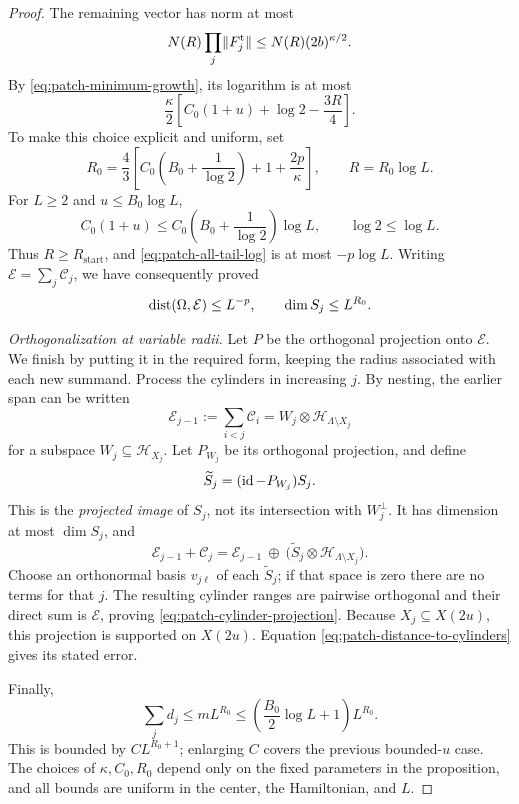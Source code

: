 \begin{proof}
The remaining vector has norm at most
\[
 N(R)\prod_j\lVert F_j^{\mathrm t}\rVert
       \leq N(R)(2b)^{\kappa/2}.
\]
By \eqref{eq:patch-minimum-growth}, its logarithm is at most
\begin{equation}
 \frac{\kappa}{2}
       \left[C_0(1+u)+\log2-\frac{3R}{4}\right].
 \label{eq:patch-all-tail-log}
\end{equation}
To make this choice explicit and uniform, set
\begin{equation}
 R_0=\frac43\left[
           C_0\left(B_0+\frac1{\log2}\right)
                 +1+\frac{2p}{\kappa}\right],
 \qquad R=R_0\log L.
 \label{eq:patch-explicit-radius}
\end{equation}
For \(L\geq2\) and \(u\leq B_0\log L\),
\[
 C_0(1+u)\leq
       C_0\left(B_0+\frac1{\log2}\right)\log L,
 \qquad \log2\leq\log L.
\]
Thus \(R\geq R_{\mathrm{start}}\), and
\eqref{eq:patch-all-tail-log} is at most \(-p\log L\).
Writing \(\mathcal E=\sum_j\mathcal C_j\), we have consequently
proved
\begin{equation}
 \operatorname{dist}(\Omega,\mathcal E)\leq L^{-p},
 \qquad
 \dim S_j\leq L^{R_0}.
 \label{eq:patch-distance-to-cylinders}
\end{equation}

\emph{Orthogonalization at variable radii.}
Let \(P\) be the orthogonal projection onto \(\mathcal E\).
We finish by putting it in the required form, keeping the radius
associated with each new summand.  Process the cylinders in
increasing \(j\).  By nesting, the earlier span can be written
\[
 \mathcal E_{j-1}:=\sum_{i<j}\mathcal C_i
       =W_j\otimes\mathcal H_{\Lambda\setminus X_j}
\]
for a subspace \(W_j\subseteq\mathcal H_{X_j}\).
Let \(P_{W_j}\) be its orthogonal projection, and define
\[
 \widetilde S_j=(\operatorname{id}-P_{W_j})S_j.
\]
This is the \emph{projected image} of \(S_j\), not its intersection
with \(W_j^\perp\).  It has dimension at most \(\dim S_j\), and
\[
 \mathcal E_{j-1}+\mathcal C_j
    =\mathcal E_{j-1}\ \mathbin{\oplus}\
       \bigl(\widetilde S_j
                    \otimes\mathcal H_{\Lambda\setminus X_j}\bigr).
\]
Choose an orthonormal basis \(v_{j\ell}\) of each
\(\widetilde S_j\); if that space is zero there are no terms for
that \(j\).  The resulting cylinder ranges are pairwise orthogonal
and their direct sum is \(\mathcal E\), proving
\eqref{eq:patch-cylinder-projection}.  Because \(X_j\subseteq X(2u)\),
this projection is supported on \(X(2u)\).  Equation
\eqref{eq:patch-distance-to-cylinders} gives its stated error.

Finally,
\[
 \sum_j d_j\leq mL^{R_0}
       \leq \left(\frac{B_0}{2}\log L+1\right)L^{R_0}.
\]
This is bounded by \(C L^{R_0+1}\); enlarging \(C\) covers the
previous bounded-\(u\) case.  The choices of \(\kappa,C_0,R_0\)
depend only on the fixed parameters in the proposition, and all
bounds are uniform in the center, the Hamiltonian, and \(L\).
\end{proof}
